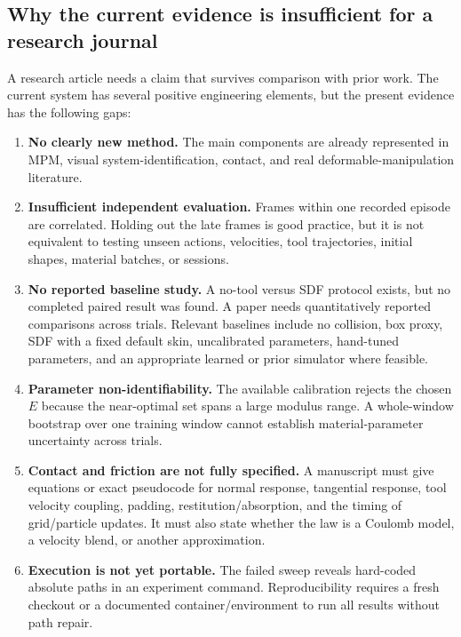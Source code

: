 \documentclass[11pt]{article}
\begin{document}
\subsection{Why the current evidence is insufficient for a research journal}

A research article needs a claim that survives comparison with prior work. The current system has several positive engineering elements, but the present evidence has the following gaps:

\begin{enumerate}[leftmargin=1.45em]
  \item \textbf{No clearly new method.} The main components are already represented in MPM, visual system-identification, contact, and real deformable-manipulation literature.
  \item \textbf{Insufficient independent evaluation.} Frames within one recorded episode are correlated. Holding out the late frames is good practice, but it is not equivalent to testing unseen actions, velocities, tool trajectories, initial shapes, material batches, or sessions.
  \item \textbf{No reported baseline study.} A no-tool versus SDF protocol exists, but no completed paired result was found. A paper needs quantitatively reported comparisons across trials. Relevant baselines include no collision, box proxy, SDF with a fixed default skin, uncalibrated parameters, hand-tuned parameters, and an appropriate learned or prior simulator where feasible.
  \item \textbf{Parameter non-identifiability.} The available calibration rejects the chosen $E$ because the near-optimal set spans a large modulus range. A whole-window bootstrap over one training window cannot establish material-parameter uncertainty across trials.
  \item \textbf{Contact and friction are not fully specified.} A manuscript must give equations or exact pseudocode for normal response, tangential response, tool velocity coupling, padding, restitution/absorption, and the timing of grid/particle updates. It must also state whether the law is a Coulomb model, a velocity blend, or another approximation.
  \item \textbf{Execution is not yet portable.} The failed sweep reveals hard-coded absolute paths in an experiment command. Reproducibility requires a fresh checkout or a documented container/environment to run all results without path repair.
\end{enumerate}
\end{document}
